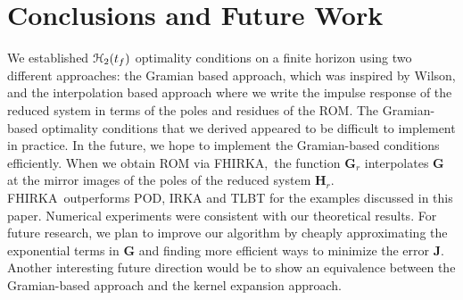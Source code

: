 \documentclass[preprint]{elsarticle}
\theoremstyle{definition}
\theoremstyle{definition}
\def\mathcal{\EuScript}
\numberwithin{equation}{section}
\newcommand{\FH}{FHIRKA}
\newcommand{\G}{\mathbf{G}}
\newcommand{\HH}{\mathbf{H}}
\newcommand{\J}{\mathbf{J}}
\newcommand{\tf}{t_f}
\newcommand{\rc}{\boldsymbol{r}}
\newcommand{\lc}{\boldsymbol{\ell}}
\newcommand{\ch}{\mathcal{H}}
\begin{document}
\section{Conclusions and Future Work} \label{sec:conc}
We established $\ch_2({\tf})$ optimality conditions on a finite horizon using two different approaches: the Gramian based approach, which was inspired by Wilson, and the interpolation based approach where we write the impulse response of the reduced system in terms of the poles and residues of the ROM. The Gramian-based optimality conditions that we derived appeared to be difficult to implement in practice. In the future, we hope to implement the Gramian-based conditions efficiently.   When we obtain ROM via \FH,\ the function $\G_r$ interpolates $\G$ at the mirror images of the poles of the reduced system $\HH_r$.  \FH\ outperforms POD, IRKA and TLBT for the examples discussed in this paper. Numerical experiments were consistent with our theoretical results. For future research, we plan to improve our algorithm by cheaply approximating the exponential terms in $\G$ and finding more efficient ways to minimize the error $\J$. Another interesting future direction would be to show an equivalence between the Gramian-based approach and the kernel expansion approach.









\end{document}
